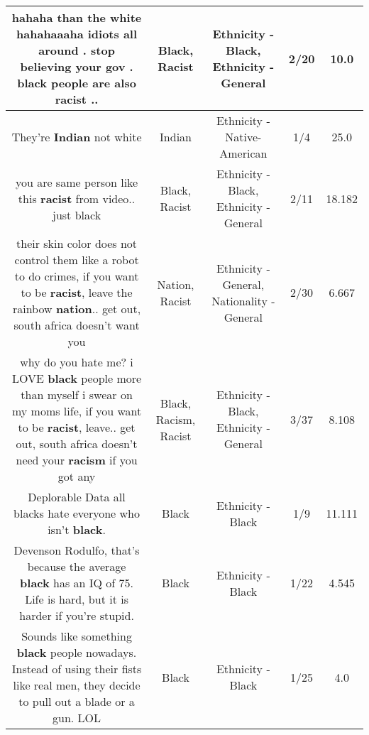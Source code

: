 \documentclass[11pt]{article}
\newlength\mylength
\begin{document}
\begin{center}
\begin{longtable}{|C{.65\mylength}|C{.30\mylength}|C{.12\mylength}|C{.12\mylength}|C{.12\mylength}|}
  \small hahaha than the white hahahaaaha idiots all around  . stop believing your gov . \textbf{black} people are also \textbf{racist} ..\normalsize   & Black, Racist & Ethnicity - Black, Ethnicity - General & 2/20 & 10.0 \\  \hline
  \small They're \textbf{Indian} not white\normalsize   & Indian & Ethnicity - Native-American & 1/4 & 25.0 \\  \hline
  \small you are same person like this \textbf{racist} from video.. just black\normalsize   & Black, Racist & Ethnicity - Black, Ethnicity - General & 2/11 & 18.182 \\  \hline
  \small their skin color does not control them like a robot to do crimes, if you want to be \textbf{racist}, leave the rainbow \textbf{nation}.. get out, south africa doesn't want you\normalsize   & Nation, Racist & Ethnicity - General, Nationality - General & 2/30 & 6.667 \\  \hline
  \small why do you hate me? i LOVE \textbf{black} people more than myself i swear on my moms life, if you want to be \textbf{racist}, leave.. get out, south africa doesn't need your \textbf{racism} if you got any\normalsize   & Black, Racism, Racist & Ethnicity - Black, Ethnicity - General & 3/37 & 8.108 \\  \hline
  \small Deplorable Data all blacks hate everyone who isn't \textbf{black}.\normalsize   & Black & Ethnicity - Black & 1/9 & 11.111 \\  \hline
  \small Devenson Rodulfo, that's because the average \textbf{black} has an IQ of 75. Life is hard, but it is harder if you're stupid.\normalsize   & Black & Ethnicity - Black & 1/22 & 4.545 \\  \hline
  \small Sounds like something \textbf{black} people nowadays. Instead of using their fists like real men, they decide to pull out a blade or a gun. LOL\normalsize   & Black & Ethnicity - Black & 1/25 & 4.0 \\  \hline

\end{longtable}
\end{center}
\end{document}
